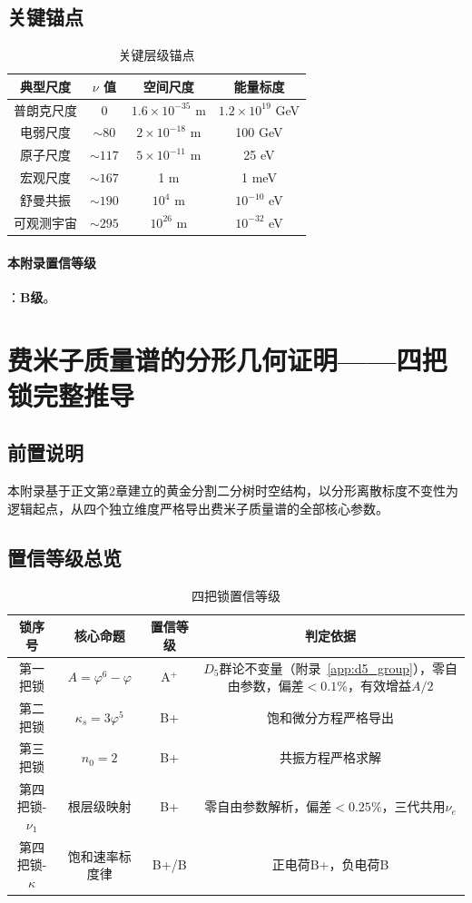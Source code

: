 \documentclass[12pt,a4paper,twocolumn]{article}
\renewcommand{\phi}{\varphi}
\begin{document}
\subsection{关键锚点}
\begin{table}[H]
\centering
\footnotesize
\caption{关键层级锚点}
\begin{tabular}{c|c|c|c}
\hline
\textbf{典型尺度} & $\nu$ 值 & \textbf{空间尺度} & \textbf{能量标度} \\
\hline
普朗克尺度 & 0 & $1.6\times10^{-35}$ m & $1.2\times10^{19}$ GeV \\
电弱尺度 & $\sim80$ & $2\times10^{-18}$ m & 100 GeV \\
原子尺度 & $\sim117$ & $5\times10^{-11}$ m & 25 eV \\
宏观尺度 & $\sim167$ & 1 m & 1 meV \\
舒曼共振 & $\sim190$ & $10^4$ m & $10^{-10}$ eV \\
可观测宇宙 & $\sim295$ & $10^{26}$ m & $10^{-32}$ eV \\
\hline
\end{tabular}
\end{table}

\paragraph{本附录置信等级}：\textbf{B级}。

\section{费米子质量谱的分形几何证明——四把锁完整推导}
\label{app:four_locks}

\subsection{前置说明}
本附录基于正文第2章建立的黄金分割二分树时空结构，以分形离散标度不变性为逻辑起点，从四个独立维度严格导出费米子质量谱的全部核心参数。

\subsection{置信等级总览}
\begin{table}[H]
\centering
\footnotesize
\caption{四把锁置信等级}
\begin{tabular}{c|c|c|c}
\hline
\textbf{锁序号} & \textbf{核心命题} & \textbf{置信等级} & \textbf{判定依据} \\
\hline
第一把锁 & $A=\phi^6-\phi$ & A$^+$ & $D_5$群论不变量（附录~\ref{app:d5_group}），零自由参数，偏差$<0.1\%$，有效增益$A/2$ \\
第二把锁 & $\kappa_s=3\phi^5$ & B+ & 饱和微分方程严格导出 \\
第三把锁 & $n_0=2$ & B+ & 共振方程严格求解 \\
第四把锁-$\nu_1$ & 根层级映射 & B+ & 零自由参数解析，偏差$<0.25\%$，三代共用$\nu_e$ \\
第四把锁-$\kappa$ & 饱和速率标度律 & B+/B & 正电荷B+，负电荷B \\
\hline
\end{tabular}
\end{table}
\end{document}
